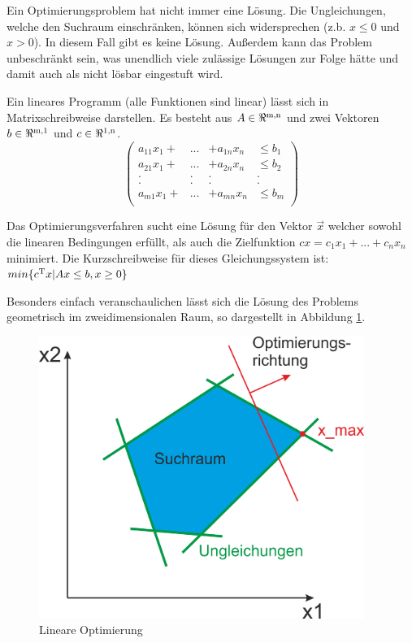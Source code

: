 \documentclass{like}
\begin{document}
Ein Optimierungsproblem hat nicht immer eine Lösung. Die Ungleichungen, welche den Suchraum einschränken, können sich widersprechen (z.b. $x \leq 0 $ und $x > 0$). In diesem Fall gibt es keine Lösung. Außerdem kann das Problem unbeschränkt sein, was unendlich viele zulässige Lösungen zur Folge hätte und damit auch als nicht lösbar eingestuft wird. 

Ein lineares Programm (alle Funktionen sind linear) lässt sich in Matrixschreibweise darstellen. Es besteht aus $A \in \Re \textsuperscript{m,n}$ und zwei Vektoren $b \in \Re \textsuperscript{m,1}$ und $c \in \Re \textsuperscript{1,n}$. \\

\[ \left( \begin{array}{cccc}
a_{11} x_1 + & ... & + a_{1n} x_n & \leq b_1 \\   	
a_{21} x_1 + & ... & + a_{2n} x_n & \leq b_2 \\ 
. & . & . & . \\
. & . & . & . \\
a_{m1} x_1 + & ... & + a_{mn} x_n & \leq b_m \\
\end{array} \right)\] 

Das Optimierungsverfahren sucht eine Lösung für den Vektor \(\vec{x}\) welcher sowohl die linearen Bedingungen erfüllt, als auch die Zielfunktion 
$cx=c_1 x_1 + ... + c_n x_n$ minimiert.
Die Kurzschreibweise für dieses Gleichungssystem ist: \\
$min \{ c\textsuperscript{T}x | Ax \leq b, x \geq 0 \}$

Besonders einfach veranschaulichen lässt sich die Lösung des Problems geometrisch im zweidimensionalen Raum, so dargestellt in Abbildung \ref*{fig:linOpt}.

\begin{figure}[ht!]
	\centering
	\includegraphics[width=300pt]{Abbildungen/linearOpt.png}
	\caption{Lineare Optimierung}
	\label{fig:linOpt}
\end{figure}
\end{document}
